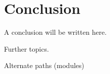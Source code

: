 \clearpage{\thispagestyle{empty}}
\section{Conclusion}

A conclusion will be written here.  \lipsum[8]

Further topics. \lipsum[9]

Alternate paths (modules) \lipsum[10]